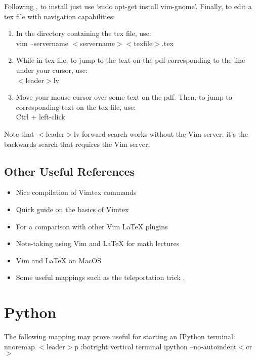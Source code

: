 \documentclass[10pt]{article}
\newcommand{\tlangle}{$<$}
\newcommand{\trangle}{$>$}
\begin{document}
Following \cite{lerner2004enable}, to install just use `sudo apt-get install vim-gnome'. Finally, to edit a tex file
with navigation capabilities:
\begin{enumerate}
    \item In the directory containing the tex file, use:\\
        vim --servername \tlangle servername\trangle \tlangle texfile\trangle.tex
    \item While in tex file, to jump to the text on the pdf corresponding to the line under your cursor, use:\\
        \tlangle leader\trangle lv
    \item Move your mouse cursor over some text on the pdf. Then, to jump to corresponding text on the tex file, use:\\
        Ctrl + left-click
\end{enumerate}
Note that \tlangle leader\trangle lv forward search works without the Vim server; it's the backwards search that requires the Vim server.

\subsection{Other Useful References}
\begin{itemize}
    \item Nice compilation of Vimtex commands \cite{gunther2014vimtex}
    \item Quick guide on the basics of Vimtex \cite{jdhao2019complete}
    \item For a comparison with other Vim LaTeX plugins \cite{lervag2015vim}
    \item Note-taking using Vim and LaTeX for math lectures \cite{castel2019how}
    \item Vim and LaTeX on MacOS \cite{dyke2020getting}
    \item Some useful mappings such as the teleportation trick \cite{smith2016my, smith2017start}. 
\end{itemize}

\section{Python}
The following mapping may prove useful for starting an IPython terminal:\\ 
nnoremap \tlangle leader\trangle p :botright vertical terminal ipython --no-autoindent\tlangle cr\trangle
\end{document}
